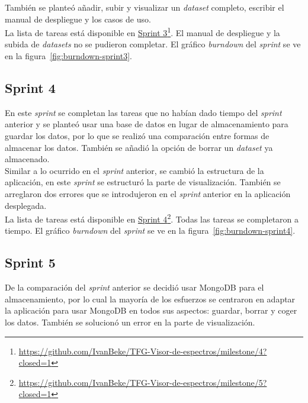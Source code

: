 También se planteó añadir, subir y visualizar un \textit{dataset} completo,
escribir el manual de despliegue y los casos de uso.\\

La lista de tareas está disponible en
\href{https://github.com/IvanBeke/TFG-Visor-de-espectros/milestone/4?closed=1}{Sprint
	3}\footnote{\url{https://github.com/IvanBeke/TFG-Visor-de-espectros/milestone/4?closed=1}}.
El manual de despliegue y la subida de \textit{datasets} no se pudieron
completar. El gráfico \textit{burndown} del \textit{sprint} se ve en la
figura~\ref{fig:burndown-sprint3}.\\


\subsection{Sprint 4}
En este \textit{sprint} se completan las tareas que no habían dado tiempo del
\textit{sprint} anterior y se planteó usar una base de datos en lugar de
almacenamiento para guardar los datos, por lo que se realizó una comparación
entre formas de almacenar los datos. También se añadió la opción de borrar un
\textit{dataset} ya almacenado.\\

Similar a lo ocurrido en el \textit{sprint} anterior, se cambió la estructura 
de la aplicación, en este \textit{sprint} se estructuró la parte de 
visualización. También se arreglaron dos errores que se introdujeron en el
\textit{sprint} anterior en la aplicación desplegada.\\

La lista de tareas está disponible en
\href{https://github.com/IvanBeke/TFG-Visor-de-espectros/milestone/5?closed=1}{Sprint
	4}\footnote{\url{https://github.com/IvanBeke/TFG-Visor-de-espectros/milestone/5?closed=1}}.
Todas las tareas se completaron a tiempo. El gráfico \textit{burndown} del
\textit{sprint} se ve en la figura~\ref{fig:burndown-sprint4}.\\


\subsection{Sprint 5}
De la comparación del \textit{sprint} anterior se decidió usar MongoDB para el
almacenamiento, por lo cual la mayoría de los esfuerzos se centraron en adaptar
la aplicación para usar MongoDB en todos sus aspectos: guardar, borrar y coger
los datos. También se solucionó un error en la parte de visualización.\\

